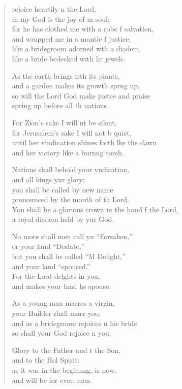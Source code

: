\begin{verse}
  \begin{patverse}
 rejoice heartily \pointup{\i}n the Lord,\Med\\
in my God is the joy of m soul;\\
for he has clothed me with a robe f salvation,\Med\\
and wrapped me in a mantle f justice,\\
like a bridegroom adorned w\pointup{\i}th a diadem,\Med\\
like a bride bedecked with hr jewels.

As the earth brings frth its plants,\Med\\
and a garden makes its growth spr\pointup{\i}ng up,\\
so will the Lord God make just\pointup{\i}ce and praise\Med\\
spring up before all th nations.

For Zion’s sake I will nt be silent,\Med\\
for Jerusalem’s sake I will not b quiet,\\
until her vindication shines forth l\pointup{\i}ke the dawn\Med\\
and her victory like a burn\pointup{\i}ng torch.

Nations shall behold your v\pointup{\i}ndication,\Med\\
and all kings yur glory;\\
you shall be called by  new name\Med\\
pronounced by the mouth of th Lord.\\
You shall be a glorious crown in the hand f the Lord,\Med\\
a royal diadem held by yur God.

No more shall men call yu “Forsaken,”\Med\\
or your land “Deslate,”\\
but you shall be called “M Delight,”\Med\\
and your land “spoused.”\\
For the Lord del\pointup{\i}ghts in you,\Med\\
and makes your land h\pointup{\i}s spouse.

As a young man marr\pointup{\i}es a virgin,\Med\\
your Builder shall marr you;\\
and as a bridegroom rejoices \pointup{\i}n his bride\Med\\
so shall your God rejoice \pointup{\i}n you.

Glory to the Father and t the Son,\Med\\
    and to the Hol Spirit:\\
as it was in the beginn\pointup{\i}ng, is now,\Med\\
    and will be for ever. men.
  \end{patverse}
\end{verse}
